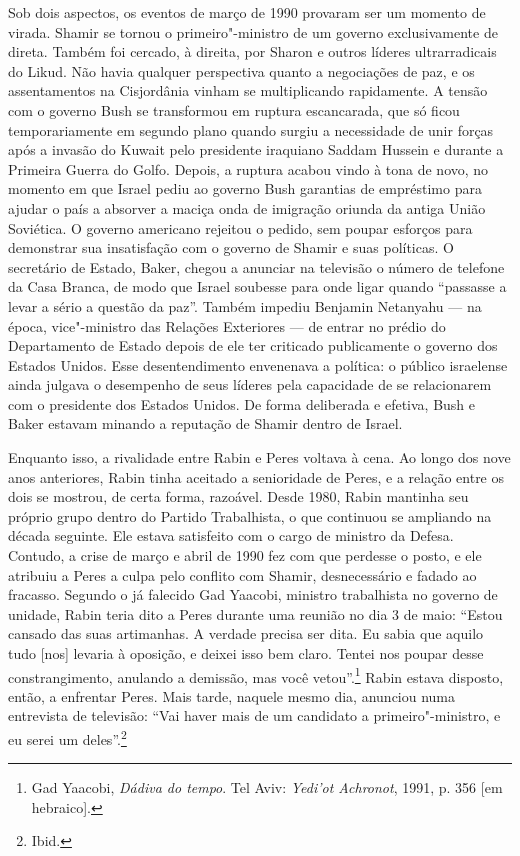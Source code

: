 Sob dois aspectos, os eventos de março de 1990 provaram ser um momento
de virada. Shamir se tornou o primeiro"-ministro de um governo
exclusivamente de direta. Também foi cercado, à direita, por Sharon e
outros líderes ultrarradicais do Likud. Não havia qualquer perspectiva
quanto a negociações de paz, e os assentamentos na Cisjordânia vinham se
multiplicando rapidamente. A tensão com o governo Bush se transformou em
ruptura escancarada, que só ficou temporariamente em segundo plano
quando surgiu a necessidade de unir forças após a invasão do Kuwait pelo
presidente iraquiano Saddam Hussein e durante a Primeira Guerra do
Golfo. Depois, a ruptura acabou vindo à tona de novo, no momento em que
Israel pediu ao governo Bush garantias de empréstimo para ajudar o país
a absorver a maciça onda de imigração oriunda da antiga União Soviética.
O governo americano rejeitou o pedido, sem poupar esforços para
demonstrar sua insatisfação com o governo de Shamir e suas políticas. O
secretário de Estado, Baker, chegou a anunciar na televisão o número de
telefone da Casa Branca, de modo que Israel soubesse para onde ligar
quando ``passasse a levar a sério a questão da paz''. Também impediu
Benjamin Netanyahu --- na época, vice"-ministro das Relações Exteriores ---
de entrar no prédio do Departamento de Estado depois de ele ter
criticado publicamente o governo dos Estados Unidos. Esse
desentendimento envenenava a política: o público israelense ainda
julgava o desempenho de seus líderes pela capacidade de se relacionarem
com o presidente dos Estados Unidos. De forma deliberada e efetiva, Bush
e Baker estavam minando a reputação de Shamir dentro de Israel.

Enquanto isso, a rivalidade entre Rabin e Peres voltava à cena. Ao longo
dos nove anos anteriores, Rabin tinha aceitado a senioridade de Peres, e
a relação entre os dois se mostrou, de certa forma, razoável. Desde
1980, Rabin mantinha seu próprio grupo dentro do Partido Trabalhista, o
que continuou se ampliando na década seguinte. Ele estava satisfeito com
o cargo de ministro da Defesa. Contudo, a crise de março e abril de 1990
fez com que perdesse o posto, e ele atribuiu a Peres a culpa pelo
conflito com Shamir, desnecessário e fadado ao fracasso. Segundo o já
falecido Gad Yaacobi, ministro trabalhista no governo de unidade, Rabin
teria dito a Peres durante uma reunião no dia 3 de maio: ``Estou cansado
das suas artimanhas. A verdade precisa ser dita. Eu sabia que aquilo
tudo {[}nos{]} levaria à oposição, e deixei isso bem claro. Tentei nos
poupar desse constrangimento, anulando a demissão, mas você
vetou''.\footnote{Gad Yaacobi, \textit{Dádiva do tempo}. Tel Aviv: \textit{Yedi'ot Achronot}, 1991, p. 356 {[}em
  hebraico{]}.} Rabin estava disposto, então, a enfrentar Peres. Mais
tarde, naquele mesmo dia, anunciou numa entrevista de televisão: ``Vai
haver mais de um candidato a primeiro"-ministro, e eu serei um
deles''.\footnote{Ibid.}

